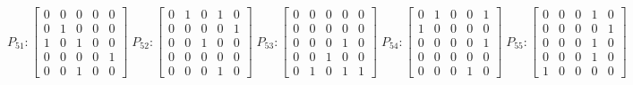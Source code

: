     $$
        P_{51} : \begin{bmatrix}
            0 & 0 & 0 & 0 & 0 \\
            0 & 1 & 0 & 0 & 0 \\
            1 & 0 & 1 & 0 & 0 \\
            0 & 0 & 0 & 0 & 1 \\
            0 & 0 & 1 & 0 & 0
        \end{bmatrix}
        \;
         P_{52} : \begin{bmatrix}
            0 & 1 & 0 & 1 & 0 \\
            0 & 0 & 0 & 0 & 1 \\
            0 & 0 & 1 & 0 & 0 \\
            0 & 0 & 0 & 0 & 0 \\
            0 & 0 & 0 & 1 & 0
        \end{bmatrix}
        \;
        P_{53} : \begin{bmatrix}
            0 & 0 & 0 & 0 & 0 \\
            0 & 0 & 0 & 0 & 0 \\
            0 & 0 & 0 & 1 & 0 \\
            0 & 0 & 1 & 0 & 0 \\
            0 & 1 & 0 & 1 & 1
        \end{bmatrix}
        \;
        P_{54} : \begin{bmatrix}
            0 & 1 & 0 & 0 & 1 \\
            1 & 0 & 0 & 0 & 0 \\
            0 & 0 & 0 & 0 & 1 \\
            0 & 0 & 0 & 0 & 0 \\
            0 & 0 & 0 & 1 & 0
        \end{bmatrix}
        \;
        P_{55} : \begin{bmatrix}
            0 & 0 & 0 & 1 & 0 \\
            0 & 0 & 0 & 0 & 1 \\
            0 & 0 & 0 & 1 & 0 \\
            0 & 0 & 0 & 1 & 0 \\
            1 & 0 & 0 & 0 & 0
        \end{bmatrix}
    $$

